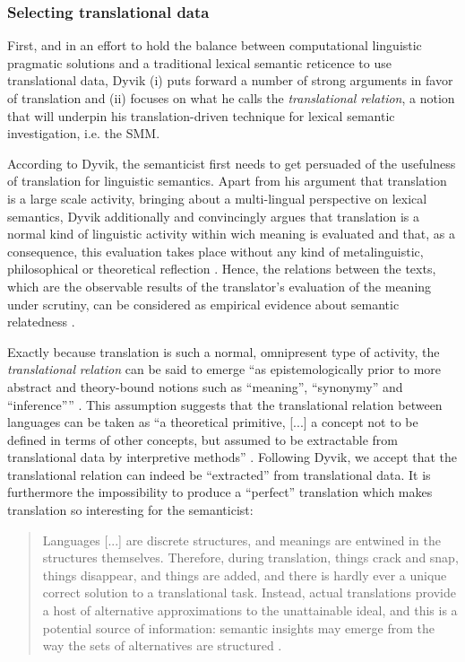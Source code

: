\subsubsection{\label{sec:2.3.4.1}  Selecting translational data}
First, and in an effort to hold the balance between computational linguistic pragmatic solutions and a traditional lexical semantic reticence to use translational data, Dyvik (i) puts forward a number of strong arguments in favor of translation and (ii) focuses on what he calls the \textit{translational} \textit{relation}, a notion that will underpin his translation-driven technique for lexical semantic investigation, i.e. the SMM.

According to Dyvik, the semanticist first needs to get persuaded of the usefulness of translation for linguistic semantics. Apart from his argument that translation is a large scale activity, bringing about a multi-lingual perspective on lexical semantics, Dyvik additionally and convincingly argues that translation is a normal kind of linguistic activity within wich meaning is evaluated and that, as a consequence, this evaluation takes place without any kind of metalinguistic, philosophical or theoretical reflection \citep[51]{johansson_translational_1998}. Hence, the relations between the texts, which are the observable results of the translator’s evaluation of the meaning under scrutiny, can be considered as empirical evidence about semantic relatedness \citep[51]{johansson_translational_1998}.

Exactly because translation is such a normal, omnipresent type of activity, the \textit{translational} \textit{relation} can be said to emerge “as epistemologically prior to more abstract and theory-bound notions such as ``meaning'', ``synonymy'' and ``inference{''}” \citep[27]{langemets_translations_2005}. This assumption suggests that the translational relation between languages can be taken as “a theoretical primitive, [...] a concept not to be defined in terms of other concepts, but assumed to be extractable from translational data by interpretive methods” \citep[27]{langemets_translations_2005}. Following Dyvik, we accept that the translational relation can indeed be ``extracted'' from translational data. It is furthermore the impossibility to produce a ``perfect'' translation which makes translation so interesting for the semanticist:

\begin{quote}
Languages [...] are discrete structures, and meanings are entwined in the structures themselves. Therefore, during translation, things crack and snap, things disappear, and things are added, and there is hardly ever a unique correct solution to a translational task. Instead, actual translations provide a host of alternative approximations to the unattainable ideal, and this is a potential source of information: semantic insights may emerge from the way the sets of alternatives are structured \citep[28]{langemets_translations_2005}.
\end{quote}



